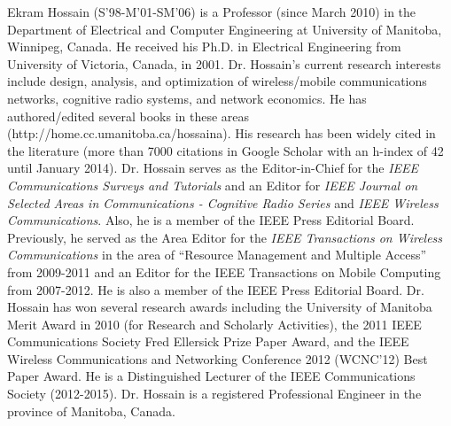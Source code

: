 \documentclass[twocolumn,10pt]{IEEEtran}
\begin{document}
\begin{IEEEbiography} 
{Ekram Hossain} (S'98-M'01-SM'06)  
is a Professor (since March 2010) in the Department of Electrical and Computer Engineering at University of Manitoba, Winnipeg, Canada. He received his Ph.D. in Electrical Engineering from University of Victoria, Canada, in 2001. Dr. Hossain's current research interests include design, analysis, and optimization of wireless/mobile communications networks, cognitive radio systems, and network economics.  He has authored/edited several books in these areas (http://home.cc.umanitoba.ca/hossaina). His research has been widely cited in the literature (more than 7000 citations in
Google Scholar with an h-index of 42 until January 2014). Dr. Hossain  serves as the Editor-in-Chief for the {\em IEEE Communications Surveys and Tutorials}  and an Editor for {\em IEEE Journal on Selected Areas in Communications - Cognitive Radio Series} and {\em IEEE Wireless Communications}.  Also, he is a member of the IEEE Press Editorial Board. Previously, he served as the Area Editor for the {\em IEEE Transactions on Wireless Communications} in the area of  ``Resource Management and Multiple Access'' from 2009-2011 and an Editor for the IEEE Transactions on Mobile Computing from 2007-2012. He is also a member of the IEEE Press Editorial Board. Dr. Hossain has won several research awards including the University of Manitoba Merit Award in 2010 (for Research and Scholarly Activities), the 2011 IEEE Communications Society Fred Ellersick Prize Paper Award, and the IEEE Wireless Communications and Networking Conference 2012 (WCNC'12) Best Paper Award. He is a Distinguished Lecturer of the IEEE Communications Society (2012-2015). Dr. Hossain is a registered Professional Engineer in the province of Manitoba, Canada. 
\end{IEEEbiography}
\end{document}
